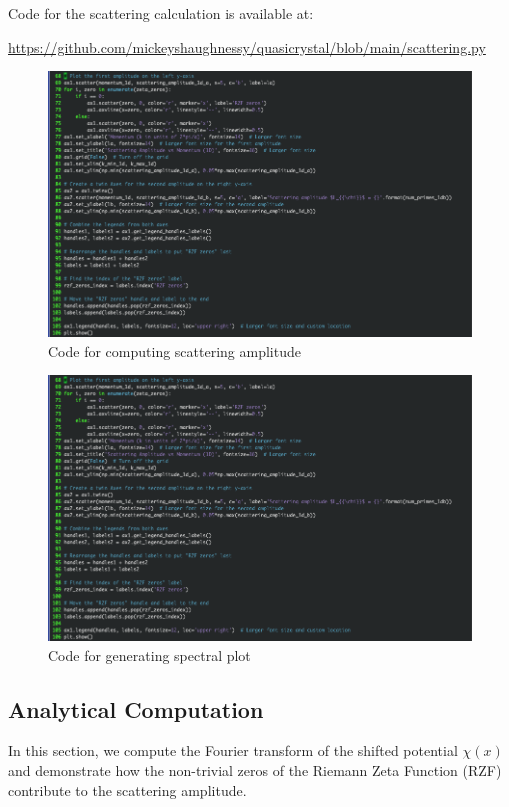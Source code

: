 \documentclass[11pt, oneside]{article}
\begin{document}
Code for the scattering calculation is available at:
 
\url{https://github.com/mickeyshaughnessy/quasicrystal/blob/main/scattering.py}
 
\begin{figure}[htbp]
\begin{center}
    \includegraphics[width=0.8\linewidth]{../images/scattering_code.png}
\caption{Code for computing scattering amplitude}
\label{fig:scattering_code}
\end{center}
\end{figure}
 
\begin{figure}[htbp]
\begin{center}
    \includegraphics[width=0.8\linewidth]{../images/plotting_code.png}
\caption{Code for generating spectral plot}
\label{fig:plotting_code}
\end{center}
\end{figure}

\subsection{Analytical Computation}

In this section, we compute the Fourier transform of the shifted potential $\chi(x)$ and demonstrate how the non-trivial zeros of the Riemann Zeta Function (RZF) contribute to the scattering amplitude.
\end{document}
